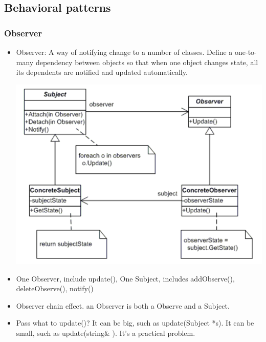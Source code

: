 \documentclass[a4paper,12pt,twoside]{book}
\begin{document}
\subsection{Behavioral  patterns}

\subsubsection{Observer}
\begin{itemize}
\item Observer: A way of notifying change to a number of classes. Define a one-to-many dependency between objects so that when one object changes state, all its dependents are notified and updated automatically.

\includegraphics[scale=0.69]{pics/observer.png}

\item One Observer, include update(), One Subject, includes addObserve(), deleteObserve(), notify()

\item Observer chain effect. an Observer is both a Observe and a Subject. 

\item Pass what to update()? It can be big, such as update(Subject *s).  It can be small, such as update(string\& ).  It's a practical problem. 

\end{itemize}
\end{document}

